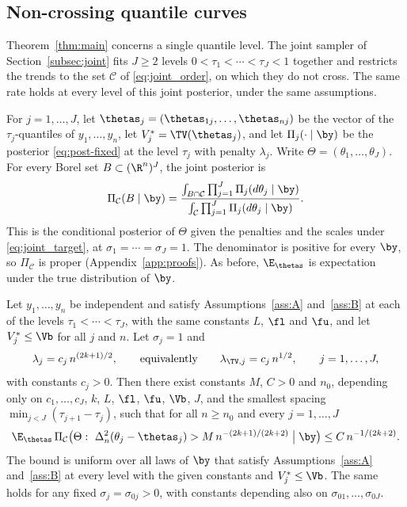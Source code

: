 \subsection{Non-crossing quantile curves}\label{sec:joint-result}

Theorem~\ref{thm:main} concerns a single quantile level. The joint sampler of Section~\ref{subsec:joint} fits $J\ge2$ levels $0<\tau_1<\cdots<\tau_J<1$ together and restricts the trends to the set $\mathcal C$ of \eqref{eq:joint_order}, on which they do not cross. The same rate holds at every level of this joint posterior, under the same assumptions.

For $j=1,\dots,J$, let $\thetas_j=(\thetas_{1j},\dots,\thetas_{nj})$ be the vector of the $\tau_j$-quantiles of $y_1,\dots,y_n$, let $V^{*}_j=\TV(\thetas_j)$, and let $\Pi_j(\cdot\mid\by)$ be the posterior \eqref{eq:post-fixed} at the level $\tau_j$ with penalty $\lambda_j$. Write $\Theta=(\theta_1,\dots,\theta_J)$. For every Borel set $B\subset(\R^n)^J$, the joint posterior is
\begin{equation}\label{eq:joint-fixed}
\Pi_{\mathcal C}(B\mid\by)=\frac{\int_{B\cap\mathcal C}\prod_{j=1}^J\Pi_j(d\theta_j\mid\by)}{\int_{\mathcal C}\prod_{j=1}^J\Pi_j(d\theta_j\mid\by)} .
\end{equation}
This is the conditional posterior of $\Theta$ given the penalties and the scales under \eqref{eq:joint_target}, at $\sigma_1=\cdots=\sigma_J=1$. The denominator is positive for every $\by$, so $\Pi_{\mathcal C}$ is proper (Appendix~\ref{app:proofs}). As before, $\E_{\thetas}$ is expectation under the true distribution of $\by$.

\begin{theorem}\label{thm:joint}
Let $y_1,\dots,y_n$ be independent and satisfy Assumptions~\ref{ass:A} and~\ref{ass:B} at each of the levels $\tau_1<\cdots<\tau_J$, with the same constants $L$, $\fl$ and $\fu$, and let $V^{*}_j\le\Vb$ for all $j$ and $n$. Let $\sigma_j=1$ and
\[
\lambda_j=c_j\,n^{(2k+1)/2},\qquad\text{equivalently}\qquad\lambda_{\TV,j}=c_j\,n^{1/2},\qquad j=1,\dots,J,
\]
with constants $c_j>0$. Then there exist constants $M$, $C>0$ and $n_0$, depending only on $c_1,\dots,c_J$, $k$, $L$, $\fl$, $\fu$, $\Vb$, $J$, and the smallest spacing $\min_{j<J}(\tau_{j+1}-\tau_j)$, such that for all $n\ge n_0$ and every $j=1,\dots,J$
\[
\E_{\thetas}\,\Pi_{\mathcal C}\bigl(\Theta:\ \Delta_n^2(\theta_j-\thetas_j)>M\,n^{-(2k+1)/(2k+2)}\bigm|\by\bigr)\le C\,n^{-1/(2k+2)}.
\]
The bound is uniform over all laws of $\by$ that satisfy Assumptions~\ref{ass:A} and~\ref{ass:B} at every level with the given constants and $V^{*}_j\le\Vb$. The same holds for any fixed $\sigma_j=\sigma_{0j}>0$, with constants depending also on $\sigma_{01},\dots,\sigma_{0J}$.
\end{theorem}

